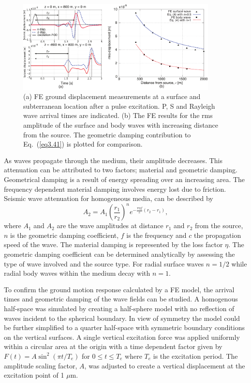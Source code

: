 \begin{figure}[t] %
   \begin{center}
   \includegraphics[width=0.9\textwidth]{./Sec_SiteInfra/Figures/Check_surfbulk.pdf} 
  \caption{(a) FE ground displacement measurements at a surface and subterranean location after a pulse excitation. P, S and Rayleigh wave arrival times are indicated. (b) The FE results for the rms amplitude of the surface and body waves with increasing distance from the source. The geometric damping contribution to Eq.~(\ref{eq3.41}) is plotted for comparison.}
 	 \label{fig3.9}
  \end{center}
\end{figure}

As waves propagate through the medium, their amplitude decreases. This attenuation can be attributed to two factors; material and geometric damping. Geometrical damping is a result of energy spreading over an increasing area. The frequency dependent material damping involves energy lost due to friction. Seismic wave attenuation for homogeneous media, can be described by~\cite{seismic_kim}
\begin{equation}
A_2 = A_1\left(\frac{r_1}{r_2}\right)^n e^{-\frac{\pi \eta f}{c}(r_2-r_1)},
\label{eq3.41}
\end{equation}
where $A_1$ and $A_2$ are the wave amplitudes at distance $r_1$ and $r_2$ from the source, $n$ is the geometric damping coefficient, $f$ is  the frequency and $c$ the propagation speed of the wave. The material damping is represented by the loss factor $\eta$. The geometric damping coefficient can be determined analytically by assessing the type of wave involved and the source type. For radial surface waves $n=1/2$ while radial body waves within the medium decay with $n=1$.

To confirm the ground motion response calculated by a FE model, the arrival times and geometric damping of the wave fields can be studied. A homogenous half-space was simulated by creating a half-sphere model with no reflection of waves incident to the spherical boundary. In view of symmetry the model could be further simplified to a quarter half-space with symmetric boundary conditions on the vertical surfaces. A single vertical excitation force was applied uniformly within a circular area at the origin with a time dependent factor given by $F(t) = A \sin^2( \pi t/T_e)$ for $0\leq t \leq T_e$ where $T_e$ is the excitation period. The amplitude scaling factor, $A$, was adjusted to create a vertical displacement at the excitation point of 1 $\mu$m.

